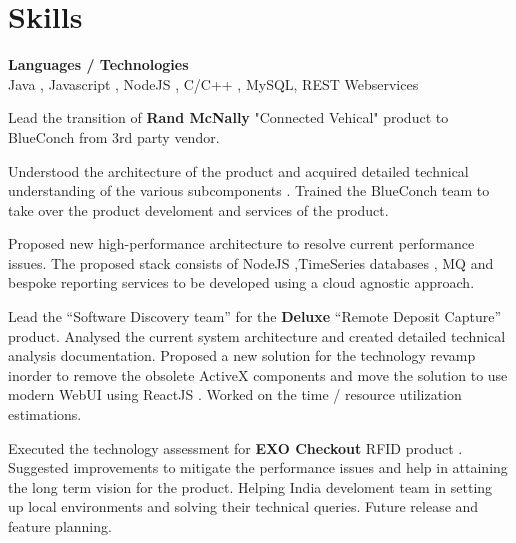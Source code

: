 \documentclass[a4,10pt]{cv4tw}
\begin{document}
\section{Skills}
\begin{skills}{}
\end{skills}

{\textbf{Languages / Technologies} \\Java , Javascript , NodeJS , C/C++ , MySQL, REST Webservices}
	{
	\begin{missions}
      \item Lead the transition of \textbf{Rand McNally} "Connected Vehical" product to BlueConch from 3rd party vendor.
      \item Understood the architecture of the product and acquired detailed technical understanding of the various subcomponents . Trained the BlueConch team to take over the product develoment and services of the product.
      \item Proposed new high-performance architecture to resolve current  performance issues. The proposed stack consists of NodeJS ,TimeSeries databases ,  MQ and bespoke reporting services to be developed  using a cloud agnostic approach.
      \vskip 4mm
      \item Lead the \enquote{Software Discovery team} for the \textbf{Deluxe} \enquote{Remote Deposit Capture} product. Analysed the current system architecture and created detailed technical analysis documentation. Proposed a new solution for the technology revamp inorder to  remove the obsolete ActiveX components and move the solution to use modern WebUI using ReactJS . Worked on the time / resource utilization estimations.
      \vskip 4mm
  \item Executed the technology assessment for \textbf{EXO Checkout} RFID product . Suggested improvements to mitigate the performance issues and help in attaining the long term vision for the product. Helping India develoment team in setting up local environments and solving their technical queries. Future release and feature  planning.
	\end{missions}
}
\end{document}
